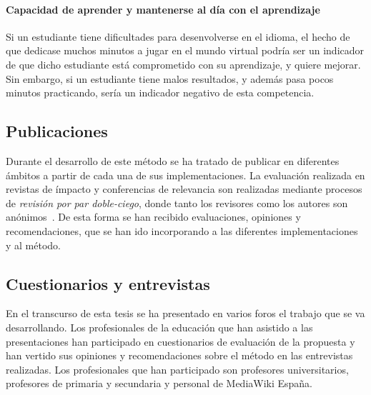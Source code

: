 \paragraph*{Capacidad de aprender y mantenerse al día con el aprendizaje}
Si un estudiante tiene dificultades para desenvolverse en el idioma, el hecho de que dedicase muchos minutos a jugar en el mundo virtual podría ser un indicador de que dicho estudiante está comprometido con su aprendizaje, y quiere mejorar. Sin embargo, si un estudiante tiene malos resultados, y además pasa pocos minutos practicando, sería un indicador negativo de esta competencia.


\subsection{Publicaciones}

Durante el desarrollo de este método se ha tratado de publicar en diferentes ámbitos a partir de cada una de sus implementaciones. La evaluación realizada en revistas de ímpacto y conferencias de relevancia son realizadas mediante procesos de \emph{revisión por par doble-ciego}, donde tanto los revisores como los autores son anónimos~\cite{ladron2008revision}. De esta forma se han recibido evaluaciones, opiniones y recomendaciones, que se han ido incorporando a las diferentes implementaciones y al método.

\subsection{Cuestionarios y entrevistas}

En el transcurso de esta tesis se ha presentado en varios foros el trabajo que se va desarrollando. Los profesionales de la educación que han asistido a las presentaciones han participado en cuestionarios de evaluación de la propuesta y han vertido sus opiniones y recomendaciones sobre el método en las entrevistas realizadas. Los profesionales que han participado son profesores universitarios, profesores de primaria y secundaria y personal de MediaWiki España.

